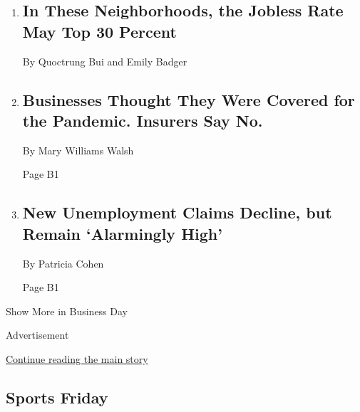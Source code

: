 \begin{enumerate}
\def\labelenumi{\arabic{enumi}.}
\item
  \href{/interactive/2020/08/05/upshot/us-unemployment-maps-coronavirus.html}{}

  \hypertarget{in-these-neighborhoods-the-jobless-rate-may-top-30-percent-1}{%
  \subsection{In These Neighborhoods, the Jobless Rate May Top 30
  Percent}\label{in-these-neighborhoods-the-jobless-rate-may-top-30-percent-1}}

  By Quoctrung Bui and Emily Badger
\item
  \href{/2020/08/05/business/business-interruption-insurance-pandemic.html}{}

  \hypertarget{businesses-thought-they-were-covered-for-the-pandemic-insurers-say-no}{%
  \subsection{Businesses Thought They Were Covered for the Pandemic.
  Insurers Say
  No.}\label{businesses-thought-they-were-covered-for-the-pandemic-insurers-say-no}}

  By Mary Williams Walsh

  Page B1
\item
  \href{/2020/08/06/business/economy/unemployment-claims.html}{}

  \hypertarget{new-unemployment-claims-decline-but-remain-alarmingly-high}{%
  \subsection{New Unemployment Claims Decline, but Remain `Alarmingly
  High'}\label{new-unemployment-claims-decline-but-remain-alarmingly-high}}

  By Patricia Cohen

  Page B1
\end{enumerate}

Show More in Business Day

Advertisement

\protect\hyperlink{after-mid4}{Continue reading the main story}

\hypertarget{sports-friday}{%
\subsection{Sports Friday}\label{sports-friday}}

